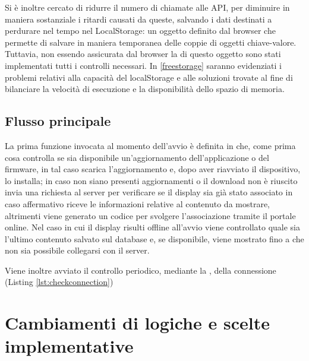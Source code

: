 Si è inoltre cercato di ridurre il numero di chiamate alle API, per diminuire in maniera sostanziale i ritardi causati da queste, salvando i dati destinati a perdurare nel tempo nel LocalStorage: un oggetto definito dal browser che permette di salvare in maniera temporanea delle coppie di oggetti chiave-valore. Tuttavia, non essendo assicurata dal browser la  di questo oggetto sono stati implementati tutti i controlli necessari. In \ref*{freestorage} saranno evidenziati i problemi relativi alla capacità del localStorage e alle soluzioni trovate al fine di bilanciare la velocità di esecuzione e la disponibilità dello spazio di memoria.

\subsection{Flusso principale}

La prima funzione invocata al momento dell'avvio è  definita in  che, come prima cosa controlla se sia disponibile un'aggiornamento dell'applicazione o del firmware, in tal caso scarica l'aggiornamento e, dopo aver riavviato il dispositivo, lo installa; in caso non siano presenti aggiornamenti o il download non è riuscito invia una richiesta al server per verificare se il display sia già stato associato in caso affermativo riceve le informazioni relative al contenuto da mostrare, altrimenti viene generato un codice per svolgere l'associazione tramite il portale online. Nel caso in cui il display risulti offline all'avvio viene controllato quale sia l'ultimo contenuto salvato sul database e, se disponibile, viene mostrato fino a che non sia possibile collegarsi con il server.

Viene inoltre avviato il controllo periodico, mediante la  , della connessione (Listing \ref*{lst:checkconnection}) 




\section{Cambiamenti di logiche e scelte implementative}
